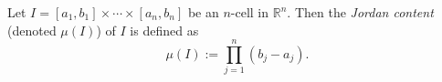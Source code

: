 \documentclass[12pt]{article}
\newcommand{\R}{\mathbb{R}}
\begin{document}
Let $I = [a_1, b_1]\times\cdots\times[a_n,b_n]$ be an $n$-cell in $\R^n$. Then the {\em Jordan content} (denoted $\mu(I)$) of $I$ is defined as
\[
  \mu(I) := \prod_{j=1}^n(b_j-a_j).
\]
\end{document}
